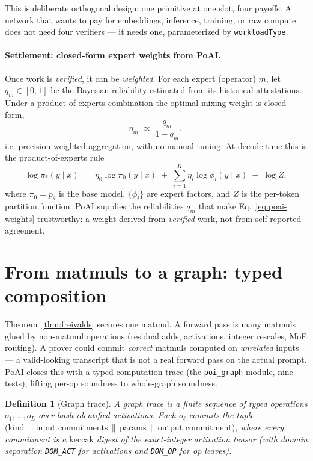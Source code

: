 \documentclass[11pt]{article}
\newtheorem{definition}{Definition}
\newcommand{\keccak}{\ensuremath{\mathrm{keccak}}}
\newcommand{\code}[1]{\texttt{#1}}
\begin{document}
This is deliberate orthogonal design: one primitive at one slot, four payoffs.
A network that wants to pay for embeddings, inference, training, or raw compute
does not need four verifiers --- it needs one, parameterized by
\code{workloadType}.

\paragraph{Settlement: closed-form expert weights from PoAI.}
Once work is \emph{verified}, it can be \emph{weighted}. For each expert
(operator) $m$, let $q_m \in [0,1]$ be the Bayesian reliability estimated from its
historical attestations. Under a product-of-experts combination the optimal
mixing weight is closed-form,
\begin{equation}\label{eq:poai-weights}
  \eta_m \;\propto\; \frac{q_m}{1 - q_m},
\end{equation}
i.e. precision-weighted aggregation, with no manual tuning. At decode time this
is the product-of-experts rule
\begin{equation}\label{eq:poe-main}
  \log \pi_*(y\mid x) \;=\; \eta_0 \log \pi_0(y\mid x)
   \;+\; \sum_{i=1}^{K} \eta_i \log \phi_i(y\mid x) \;-\; \log Z,
\end{equation}
where $\pi_0 = p_\theta$ is the base model, $\{\phi_i\}$ are expert factors, and
$Z$ is the per-token partition function. PoAI supplies the reliabilities $q_m$
that make Eq.~\eqref{eq:poai-weights} trustworthy: a weight derived from
\emph{verified} work, not from self-reported agreement.

\section{From matmuls to a graph: typed composition}
\label{sec:graph}

Theorem~\ref{thm:freivalds} secures one matmul. A forward pass is many matmuls
glued by non-matmul operations (residual adds, activations, integer rescales, MoE
routing). A prover could commit \emph{correct} matmuls computed on \emph{unrelated}
inputs --- a valid-looking transcript that is not a real forward pass on the actual
prompt. PoAI closes this with a typed computation trace (the
\code{poi\_graph} module, nine tests), lifting per-op soundness to whole-graph
soundness.

\begin{definition}[Graph trace]
A \emph{graph trace} is a finite sequence of typed operations
$o_1,\dots,o_L$ over hash-identified activations. Each $o_\ell$ commits the tuple
$\big(\text{kind}\,\|\,\text{input commitments}\,\|\,\text{params}\,\|\,
\text{output commitment}\big)$, where every commitment is a \keccak{} digest of
the exact-integer activation tensor (with domain separation \code{DOM\_ACT} for
activations and \code{DOM\_OP} for op leaves).
\end{definition}
\end{document}
